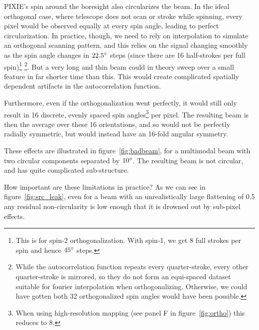 \documentclass{article}
\begin{document}
PIXIE's spin around the boresight also circularizes the beam. In the ideal
orthogonal case, where telescope does not scan or stroke while spinning, every
pixel would be observed equally at every spin angle, leading to perfect
circularization. In practice, though, we need to rely on interpolation to
simulate an orthogonal scanning pattern, and this relies on the signal changing
smoothly as the spin angle changes in $22.5\degree$ steps (since there are 16
half-strokes per full spin)\footnote{This is for spin-2 orthogonalization.
With spin-1, we get 8 full strokes per spin and hence $45\degree$ steps.}
\footnote{While the autocorrelation function repeats
every quarter-stroke, every other quarter-stroke is mirrored, so they do not
form an equi-spaced dataset suitable for fourier interpolation when orthogonalizing.
Otherwise, we could have gotten both 32 orthogonalized spin angles would have been
possible.}.
But a very long and thin beam could in theory sweep
over a small feature in far shorter time than this. This would create
complicated spatially dependent artifacts in the autocorrelation function.

Furthermore, even if the orthogonalization went perfectly, it would still only
result in 16 discrete, evenly spaced spin angles\footnote{When using
high-resolution mapping (see panel F in figure~\ref{fig:ortho}) this reduces to
8.} per pixel. The resulting beam is then the average over these 16
orientations, and so would not be perfectly radially symmetric, but would
instead have an 16-fold angular symmetry.

These effects are illustrated in figure~\ref{fig:badbeam}, for a
multimodal beam with two circular components separated by $10\degree$.
The resulting beam is not circular, and has quite complicated sub-structure.

How important are these limitations in practice? As we can see in
figure~\ref{fig:src_leak}, even for a beam with an unrealistically large
flattening of 0.5 any residual non-circularity is low enough
that it is drowned out by sub-pixel effects.
\end{document}
